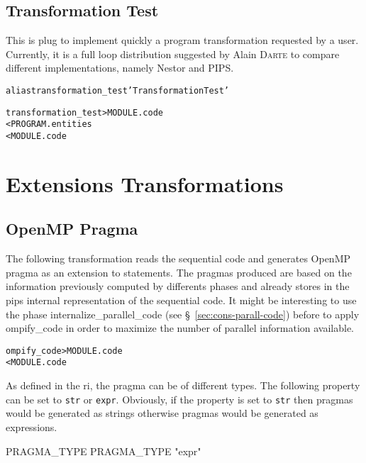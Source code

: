 \documentclass[a4paper]{report}
\newenvironment{PipsMake}{\begin{alltt}}{\end{alltt}}
\newenvironment{PipsPass}[1]{\label{pass:#1}}{}
\begin{document}
\subsection{Transformation Test}
\label{subsection-transformation_test}

\begin{PipsPass}{transformation_test}
  This is plug to implement quickly a program transformation requested
  by a user. Currently, it is a full loop distribution suggested by
  Alain \textsc{Darte} to compare different implementations, namely
  Nestor and PIPS.
\end{PipsPass}
\begin{PipsMake}
alias transformation_test 'Transformation Test'

transformation_test    > MODULE.code
        < PROGRAM.entities
        < MODULE.code
\end{PipsMake}


\section{Extensions Transformations}
\label{section-extensions_transformations}


\subsection{OpenMP Pragma}
\label{subsection-open_mp_pragma}

\begin{PipsPass}{ompify_code}
  The following transformation reads the sequential code and generates
  OpenMP pragma as an extension to statements. The pragmas produced
  are based on the information previously computed by differents
  phases and already stores in the pips internal representation of the
  sequential code. It might be interesting to use the phase
  internalize\_parallel\_code (see \S~\ref{sec:cons-parall-code})
  before to apply ompify\_code in order to maximize the number of
  parallel information available.
\end{PipsPass}

\begin{PipsMake}
ompify_code             > MODULE.code
        < MODULE.code

\end{PipsMake}

As defined in the ri, the pragma can be of different types. The following
property can be set to \verb|str| or \verb|expr|. Obviously, if the
property is set to \verb|str| then pragmas would be generated as strings
otherwise pragmas would be generated as expressions.
\begin{PipsProp}{PRAGMA_TYPE}
PRAGMA_TYPE "expr"
\end{PipsProp}
\end{document}
